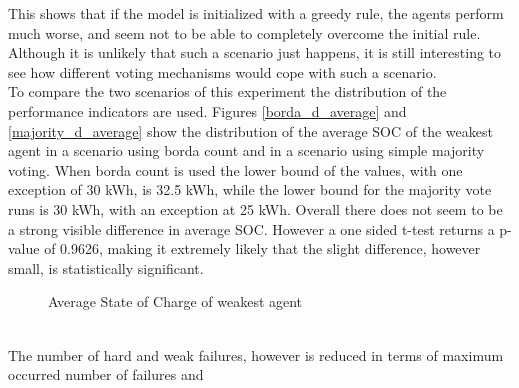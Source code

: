 \documentclass[a4paper]{article}
\begin{document}
This shows that if the model is initialized with a greedy rule, the agents perform much worse, and seem not to be able to 
completely overcome the initial rule. Although it is unlikely that such a scenario just happens, it is still interesting 
to see how different voting mechanisms would cope with such a scenario.\\
To compare the two scenarios of this experiment the distribution of the performance indicators are used. 
Figures \ref{borda_d_average} and \ref{majority_d_average} show the distribution of the average SOC of the weakest agent
in a scenario using borda count and in a scenario using simple majority voting. When borda count is used the lower bound 
of the values, with one exception of 30 kWh, is 32.5 kWh, while the lower bound for the majority vote runs is 
30 kWh, with an exception at 25 kWh. Overall there does not seem to be a strong visible difference in average SOC.
However a  one sided t-test returns a p-value of 0.9626, making it extremely likely that the slight difference, however small, is 
statistically significant.\\
\begin{figure}[!ht]
\caption{Average State of Charge of weakest agent}
\label{d_average}
\end{figure}\\
The number of hard and weak failures, however is reduced in terms of maximum occurred number of failures and 
\end{document}
